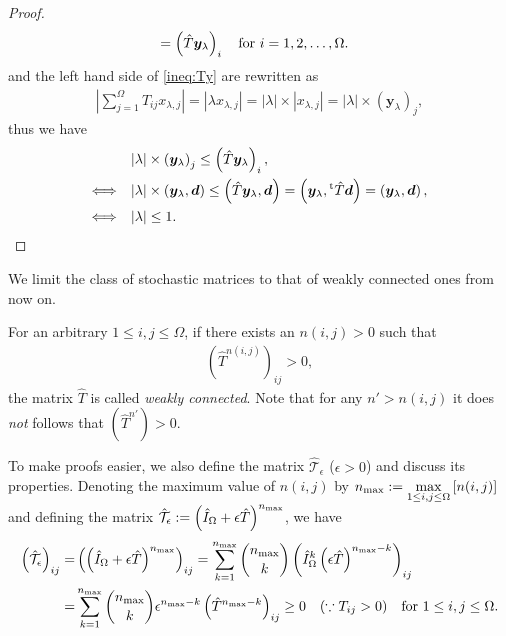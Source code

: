 \begin{proof}
\begin{align}
	&=\left(\hat{T}\bm{y}_{\lambda}\right)_{i}\quad\text{\text{for $i=1,2,\dots,\Omega$}}\label{ineq:Ty}.
	\end{align}
	and the left hand side of \eqref{ineq:Ty} are rewritten as
	\begin{align}
	|\sum_{j=1}^{\Omega}T_{ij}x_{\lambda,j}| = |\lambda x_{\lambda,j}| = |\lambda|\times |x_{\lambda,j}| = |\lambda|\times \left(\bm{y}_{\lambda}\right)_{j},
	\end{align}
	thus we have
	\begin{align}
	& |\lambda|\times \left(\bm{y}_{\lambda}\right)_{j} \leq \left(\hat{T}\bm{y}_{\lambda}\right)_{i},\\
	\Longleftrightarrow \quad& |\lambda|\times \left(\bm{y}_{\lambda},\bm{d}\right) \leq \left(\hat{T}\bm{y}_{\lambda},\bm{d}\right) = \left(\bm{y}_{\lambda},{}^{\rm t}\hat{T}\bm{d}\right) = \left(\bm{y}_{\lambda},\bm{d}\right), \\
	\Longleftrightarrow \quad& |\lambda| \leq 1.
	\end{align}
\end{proof}

We limit the class of stochastic matrices to that of weakly connected ones from now on.
\begin{definition}
	For an arbitrary $1\leq i,j\leq \Omega$, if there exists an $n(i,j)>0$ such that
	\begin{align}
	\left(\hat{T}^{n(i,j)}\right)_{ij}>0,
	\end{align}
	the matrix $\hat{T}$ is called \textit{weakly connected}. Note that for any $n'>n(i,j)$ it does \textit{not} follows that $\left(\hat{T}^{n'}\right)>0$.
\end{definition}

To make proofs easier, we also define the matrix $\hat{\mathcal{T}}_{\epsilon}$ ($\epsilon>0$) and discuss its properties. Denoting the maximum value of $n(i,j)$ by $\displaystyle n_{\rm max}:=\max_{1\leq i,j\leq \Omega}\left[n(i,j)\right]$ and defining the matrix $\hat{\mathcal{T}}_{\epsilon}:=\left(\hat{I}_{\Omega}+\epsilon \hat{T}\right)^{n_{\rm max}}$, we have
	\begin{align}
	\left(\hat{\mathcal{T}}_{\epsilon}\right)_{ij} =& \left(\left(\hat{I}_{\Omega}+\epsilon \hat{T}\right)^{n_{\rm max}}\right)_{ij} = \sum_{k=1}^{n_{\rm max}}\binom{n_{\rm max}}{k}\left({\hat{I}_{\Omega}}^{k}\left(\epsilon \hat{T}\right)^{n_{\rm max}-k}\right)_{ij}\\
	=& \sum_{k=1}^{n_{\rm max}}\binom{n_{\rm max}}{k}\epsilon^{n_{\rm max}-k}\left(\hat{T}^{n_{\rm max}-k}\right)_{ij} \geq 0 \quad(\because T_{ij}>0)\quad\text{for $1\leq i,j\leq \Omega$}.
	\end{align}

